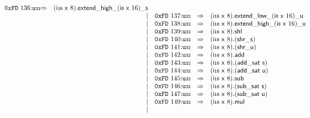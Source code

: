 $$\begin{array}{@{}l@{}rrlll@{}l@{}}
\mathtt{0xFD}~136{:}{\mathtt{u{\scriptstyle32}}} &\Rightarrow& (\mathsf{i{\scriptstyle16}}~\mathsf{x}~8) . {{{{{{\mathsf{extend}}{\mathsf{\_}}}{\mathsf{high}}}{\mathsf{\_}}}{(\mathsf{i{\scriptstyle8}}~\mathsf{x}~16)}}{\mathsf{\_}}}{\mathsf{s}} \\ &&|&
\mathtt{0xFD}~137{:}{\mathtt{u{\scriptstyle32}}} &\Rightarrow& (\mathsf{i{\scriptstyle16}}~\mathsf{x}~8) . {{{{{{\mathsf{extend}}{\mathsf{\_}}}{\mathsf{low}}}{\mathsf{\_}}}{(\mathsf{i{\scriptstyle8}}~\mathsf{x}~16)}}{\mathsf{\_}}}{\mathsf{u}} \\ &&|&
\mathtt{0xFD}~138{:}{\mathtt{u{\scriptstyle32}}} &\Rightarrow& (\mathsf{i{\scriptstyle16}}~\mathsf{x}~8) . {{{{{{\mathsf{extend}}{\mathsf{\_}}}{\mathsf{high}}}{\mathsf{\_}}}{(\mathsf{i{\scriptstyle8}}~\mathsf{x}~16)}}{\mathsf{\_}}}{\mathsf{u}} \\ &&|&
\mathtt{0xFD}~139{:}{\mathtt{u{\scriptstyle32}}} &\Rightarrow& (\mathsf{i{\scriptstyle16}}~\mathsf{x}~8) . \mathsf{shl} \\ &&|&
\mathtt{0xFD}~140{:}{\mathtt{u{\scriptstyle32}}} &\Rightarrow& (\mathsf{i{\scriptstyle16}}~\mathsf{x}~8) . ({\mathsf{shr\_}}{\mathsf{s}}) \\ &&|&
\mathtt{0xFD}~141{:}{\mathtt{u{\scriptstyle32}}} &\Rightarrow& (\mathsf{i{\scriptstyle16}}~\mathsf{x}~8) . ({\mathsf{shr\_}}{\mathsf{u}}) \\ &&|&
\mathtt{0xFD}~142{:}{\mathtt{u{\scriptstyle32}}} &\Rightarrow& (\mathsf{i{\scriptstyle16}}~\mathsf{x}~8) . \mathsf{add} \\ &&|&
\mathtt{0xFD}~143{:}{\mathtt{u{\scriptstyle32}}} &\Rightarrow& (\mathsf{i{\scriptstyle16}}~\mathsf{x}~8) . (\mathsf{add\_sat}~\mathsf{s}) \\ &&|&
\mathtt{0xFD}~144{:}{\mathtt{u{\scriptstyle32}}} &\Rightarrow& (\mathsf{i{\scriptstyle16}}~\mathsf{x}~8) . (\mathsf{add\_sat}~\mathsf{u}) \\ &&|&
\mathtt{0xFD}~145{:}{\mathtt{u{\scriptstyle32}}} &\Rightarrow& (\mathsf{i{\scriptstyle16}}~\mathsf{x}~8) . \mathsf{sub} \\ &&|&
\mathtt{0xFD}~146{:}{\mathtt{u{\scriptstyle32}}} &\Rightarrow& (\mathsf{i{\scriptstyle16}}~\mathsf{x}~8) . (\mathsf{sub\_sat}~\mathsf{s}) \\ &&|&
\mathtt{0xFD}~147{:}{\mathtt{u{\scriptstyle32}}} &\Rightarrow& (\mathsf{i{\scriptstyle16}}~\mathsf{x}~8) . (\mathsf{sub\_sat}~\mathsf{u}) \\ &&|&
\mathtt{0xFD}~149{:}{\mathtt{u{\scriptstyle32}}} &\Rightarrow& (\mathsf{i{\scriptstyle16}}~\mathsf{x}~8) . \mathsf{mul} \\ &&|&

\end{array}$$
